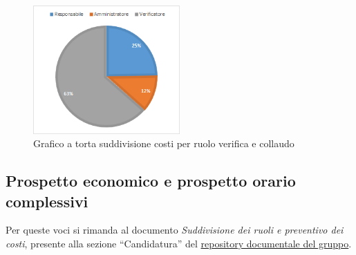 \begin{figure}[H]
    \centering
    \includegraphics[width=0.5\textwidth]{images/torta_collaudo.png}
    \caption{Grafico a torta suddivisione costi per ruolo verifica e collaudo}
    \label{fig:torta_collaudo}
\end{figure}

\subsection{Prospetto economico e prospetto orario complessivi}\label{sec:preventivo:totale}
Per queste voci si rimanda al documento \textit{Suddivisione dei ruoli e preventivo dei  costi}, presente alla sezione ``Candidatura'' del \href{https://avant-garde-software-engineering.github.io/documentazione.html}{repository documentale del gruppo}.



\newpage

\newpage


\newpage
\newpage
